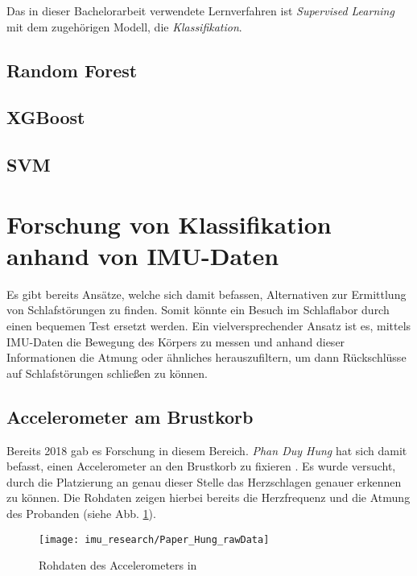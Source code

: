 Das in dieser Bachelorarbeit verwendete Lernverfahren ist \textit{Supervised Learning} mit dem zugehörigen Modell, die \textit{Klassifikation}.


\subsection{Random Forest}

\subsection{XGBoost}

\subsection{SVM}


\section{Forschung von Klassifikation anhand von IMU-Daten}
Es gibt bereits Ansätze, welche sich damit befassen, Alternativen zur Ermittlung von Schlafstörungen zu finden. 
Somit könnte ein Besuch im Schlaflabor durch einen bequemen Test ersetzt werden. 
Ein vielversprechender Ansatz ist es, mittels IMU-Daten die Bewegung des Körpers zu messen und anhand dieser Informationen die Atmung oder ähnliches herauszufiltern, um dann Rückschlüsse auf Schlafstörungen schließen zu können.

\subsection{Accelerometer am Brustkorb}
Bereits 2018 gab es Forschung in diesem Bereich. \textit{Phan Duy Hung} hat sich damit befasst, einen Accelerometer an den Brustkorb zu fixieren \cite{hung_central_2018}.
Es wurde versucht, durch die Platzierung an genau dieser Stelle das Herzschlagen genauer erkennen zu können. 
Die Rohdaten zeigen hierbei bereits die Herzfrequenz und die Atmung des Probanden (siehe Abb. \ref{imu_research_hung_rawData}).

\begin{figure}[ht]
    \centering
    \texttt{[image: imu\_research/Paper\_Hung\_rawData]}
    \caption{Rohdaten des Accelerometers in \cite{hung_central_2018}}
    \label{imu_research_hung_rawData}
\end{figure}

